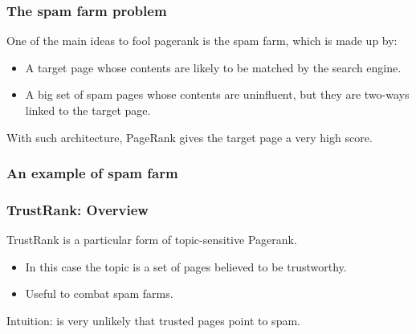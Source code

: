 \documentclass{beamer}
\begin{document}
\begin{frame}
\frametitle{The spam farm problem}
One of the main ideas to fool pagerank is the \alert{spam farm}, which is made up by:
\vfill
\begin{itemize}
\item A target page whose contents are likely to be matched by the search engine.
\item A \alert{big} set of spam pages whose contents are uninfluent, but they are two-ways linked to the target page.
\end{itemize}
\vfill
With such architecture, PageRank gives the target page a very high score.
\end{frame}

\begin{frame}
\frametitle{An example of spam farm}
\end{frame}

\begin{frame}
\frametitle{TrustRank: Overview}
TrustRank is a particular form of topic-sensitive Pagerank.
\vfill
\begin{itemize}
\item In this case the topic is a set of pages believed to be \alert{trustworthy}.
\item Useful to combat spam farms.
\end{itemize}
\vfill
Intuition: is very unlikely that trusted pages point to spam.
\end{frame}
\end{document}
